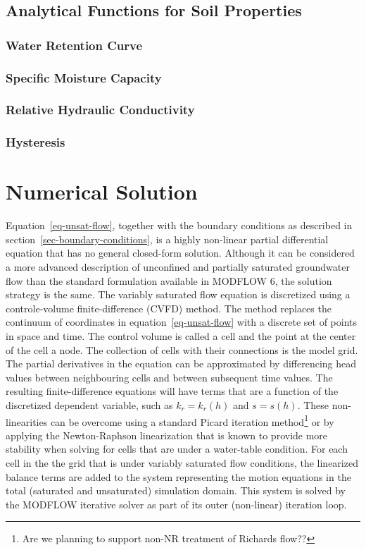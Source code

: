 \documentclass[fleqn]{article}
\begin{document}
\subsection{Analytical Functions for Soil Properties}
\subsubsection*{Water Retention Curve}
\subsubsection*{Specific Moisture Capacity}
\subsubsection*{Relative Hydraulic Conductivity}
\subsubsection*{Hysteresis}

\section{Numerical Solution}
Equation~\ref{eq-unsat-flow}, together with the boundary conditions as
described in section~\ref{sec-boundary-conditions}, is a highly non-linear
partial differential equation that has no general closed-form solution.
Although it can be considered a more advanced description of unconfined
and partially saturated groundwater flow than the standard formulation
available in MODFLOW 6, the solution strategy is the same. The variably
saturated flow equation is discretized using a controle-volume
finite-difference (CVFD) method. The method replaces the continuum of
coordinates in equation~\ref{eq-unsat-flow} with a discrete set of 
points in space and time. The control volume is called a cell and the
point at the center of the cell a node. The collection of cells with
their connections is the model grid. The partial derivatives in the
equation can be approximated by differencing head values between 
neighbouring cells and between subsequent time values. The resulting
finite-difference equations will have terms that are a function
of the discretized dependent variable, such as $k_r = k_r(h)$ and 
$s = s(h)$. These non-linearities can be overcome using a standard
Picard iteration method\footnote{Are we planning to support non-NR
treatment of Richards flow??} or by applying the Newton-Raphson 
linearization that is known to provide more stability when solving for
cells that are under a water-table condition. For each cell in the
the grid that is under variably saturated flow conditions, the
linearized balance terms are added to the system representing the
motion equations in the total (saturated and unsaturated) simulation 
domain. This system is solved by the MODFLOW iterative solver as part
of its outer (non-linear) iteration loop.
\end{document}
